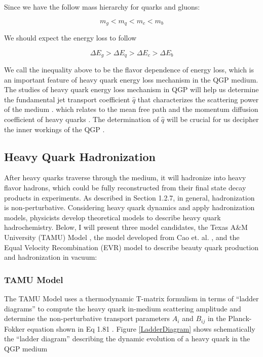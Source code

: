 Since we have the follow mass hierarchy for quarks and gluons:

\begin{equation}
m_g < m_q < m_c < m_b
\end{equation}

We should expect the energy loss to follow

\begin{equation}
\Delta E_g > \Delta E_q > \Delta E_c >  \Delta E_b
\end{equation}

We call the inequality above to be the flavor dependence of energy loss, which is an important feature of heavy quark energy loss mechanism in the QGP medium. The studies of heavy quark energy loss mechanism in QGP will help us determine the fundamental jet transport coefficient $\hat q$ that characterizes the scattering power of the medium \cite{HQReview}. which relates to the mean free path and the momentum diffusion coefficient of heavy quarks \cite{qhatStudy}. The determination of $\hat q$ will be crucial for us decipher the inner workings of the QGP \cite{JetTransProbe}.

\subsection{Heavy Quark Hadronization}

After heavy quarks traverse through the medium, it will hadronize into heavy flavor hadrons, which could be fully reconstructed from their final state decay products in experiments. As described in Section 1.2.7, in general, hadronization is non-perturbative. Considering heavy quark dynamics and apply hadronization models, physicists develop theoretical models to describe heavy quark hadrochemistry. Below, I will present three model candidates, the Texas A\&M University (TAMU) Model \cite{TAMUModel}, the model developed from Cao et. al. \cite{CaoSunKo}, and the Equal Velocity Recombination (EVR) model \cite{EVR} to describe beauty quark production and hadronization in vacuum:


\subsubsection{TAMU Model}

The TAMU Model uses a thermodynamic T-matrix formulism in terms of ``ladder diagrams'' to compute the heavy quark in-medium scattering amplitude and determine the non-perturbative transport parameters $A_i$ and $B_{ij}$ in the Planck-Fokker equation shown in Eq 1.81 \cite{TAMUModel}. Figure \ref{LadderDiagram} shows schematically the ``ladder diagram'' describing the dynamic evolution of a heavy quark in the QGP medium 

